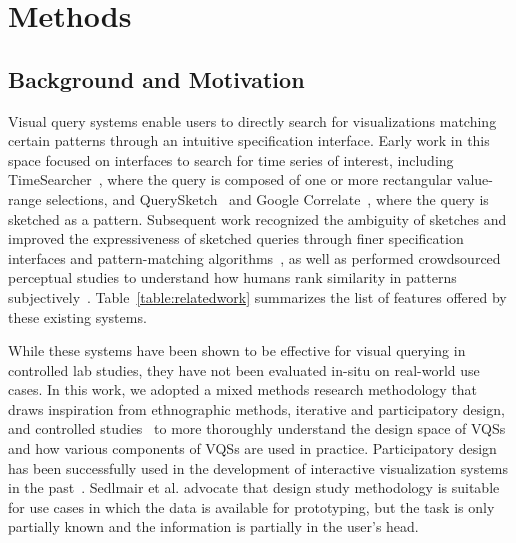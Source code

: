 \section{Methods\label{sec:methods}}
\subsection{Background and Motivation}
\par Visual query systems enable users to directly search for visualizations matching certain patterns through an intuitive specification interface. Early work in this space focused on interfaces to search for time series of interest, including TimeSearcher~\cite{Hochheiser2001,Hochheiser2004}, where the query is composed of one or more rectangular value-range selections, and QuerySketch~\cite{wattenberg2001sketching} and Google Correlate~\cite{mohebbi2011google}, where the query is sketched as a pattern. Subsequent work recognized the ambiguity of sketches and improved the expressiveness of sketched queries through finer specification interfaces and pattern-matching algorithms~\cite{ryall2005querylines,Holz2009}, as well as performed crowdsourced perceptual studies to understand how humans rank similarity in patterns subjectively~\cite{Eichmann2015,correll2016semantics,Mannino2018}. Table~\ref{table:relatedwork} summarizes the list of features offered by these existing systems.

\par While these systems have been shown to be effective for visual querying in controlled lab studies, they have not been evaluated in-situ on real-world use cases. In this work, we adopted a mixed methods research methodology that draws inspiration from ethnographic methods, iterative and participatory design, and controlled studies~\cite{Plaisant2004,lam2012empirical,shneiderman2006strategies,Muller1993} to more thoroughly understand the design space of VQSs and how various components of VQSs are used in practice. Participatory design has been successfully used in the development of interactive visualization systems in the past~\cite{Aragon2008,Chuang2012}. Sedlmair et al. \cite{Sedlmair2012} advocate that design study methodology is suitable for use cases in which the data is available for prototyping, but the task is only partially known and the information is partially in the user's head. %
